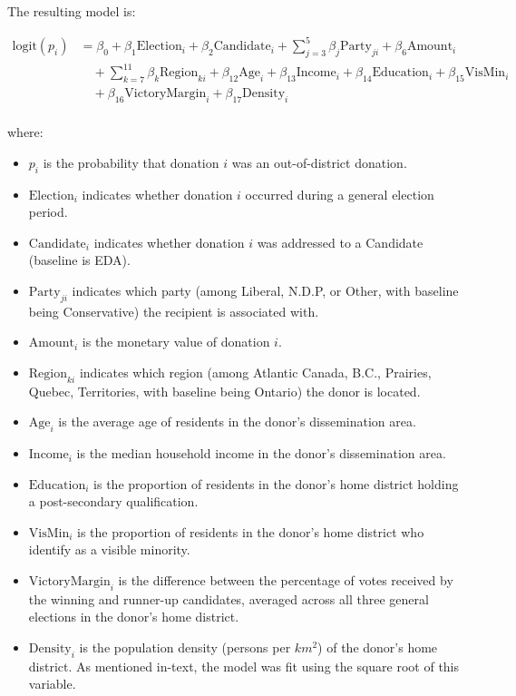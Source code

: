 \documentclass[
  letterpaper,
  DIV=11,
  numbers=noendperiod]{scrartcl}
\providecommand{\tightlist}{%
  \setlength{\itemsep}{0pt}\setlength{\parskip}{0pt}}
\begin{document}
The resulting model is:

\[
\begin{aligned}
\text{logit}(p_i) &= \beta_0 + \beta_1 \text{Election}_i + \beta_2 \text{Candidate}_{i} + \sum_{j=3}^{5} \beta_j \text{Party}_{ji} + \beta_6 \text{Amount}_i \\
&\quad + \sum_{k=7}^{11} \beta_k \text{Region}_{ki} + \beta_{12} \text{Age}_i + \beta_{13} \text{Income}_i + \beta_{14} \text{Education}_i + \beta_{15} \text{VisMin}_i \\
&\quad + \beta_{16} \text{VictoryMargin}_i + \beta_{17} \text{Density}_i \\
\end{aligned}
\]

where:

\begin{itemize}
\tightlist
\item
  \(p_i\) is the probability that donation \(i\) was an out-of-district
  donation.
\item
  \(\text{Election}_i\) indicates whether donation \(i\) occurred during
  a general election period.
\item
  \(\text{Candidate}_{i}\) indicates whether donation \(i\) was
  addressed to a Candidate (baseline is EDA).
\item
  \(\text{Party}_{ji}\) indicates which party (among Liberal, N.D.P, or
  Other, with baseline being Conservative) the recipient is associated
  with.
\item
  \(\text{Amount}_i\) is the monetary value of donation \(i\).
\item
  \(\text{Region}_{ki}\) indicates which region (among Atlantic Canada,
  B.C., Prairies, Quebec, Territories, with baseline being Ontario) the
  donor is located.
\item
  \(\text{Age}_i\) is the average age of residents in the donor's
  dissemination area.
\item
  \(\text{Income}_i\) is the median household income in the donor's
  dissemination area.
\item
  \(\text{Education}_i\) is the proportion of residents in the donor's
  home district holding a post-secondary qualification.
\item
  \(\text{VisMin}_i\) is the proportion of residents in the donor's home
  district who identify as a visible minority.
\item
  \(\text{VictoryMargin}_i\) is the difference between the percentage of
  votes received by the winning and runner-up candidates, averaged
  across all three general elections in the donor's home district.
\item
  \(\text{Density}_i\) is the population density (persons per \(km^2\))
  of the donor's home district. As mentioned in-text, the model was fit
  using the square root of this variable.
\end{itemize}
\end{document}
